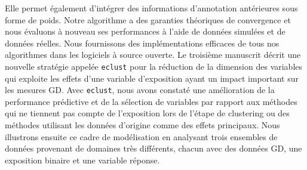 \documentclass[12pt,letterpaper]{report}
\begin{document}
\begin{romanPagenumber}{2}
{Elle permet également d'intégrer des informations d'annotation antérieures sous forme de poids. 
Notre algorithme a des garanties théoriques de convergence et nous évaluons à nouveau ses performances à l'aide de données simulées et de données réelles. Nous fournissons des implémentations efficaces de tous nos algorithmes dans les logiciels à source ouverte.
Le troisième manuscrit décrit une nouvelle stratégie appelée \texttt{eclust} pour la réduction de la dimension des variables qui exploite les effets d'une variable d'exposition ayant un impact important sur les mesures GD. Avec \texttt{eclust}, nous avons constaté une amélioration de la performance prédictive et de la sélection de variables par rapport aux méthodes qui ne tiennent pas compte de l'exposition lors de l'étape de clustering ou des méthodes utilisant les données d'origine comme des effets principaux. Nous illustrons ensuite ce cadre de modélisation en analysant trois ensembles de données provenant de domaines très différents, chacun avec des données GD, une exposition binaire et une variable réponse.
	}
	\AbstractFr
	
	
	\tableofcontents 

	\listoftables 
	\listoffigures
	
	\newpage
	
	\printacronyms[include-classes=abbrev,name=Abbreviations]
	\end{romanPagenumber}

\else
\fi


\doublespacing

\ifthesis
	
	
	
	
	
	
	
\else
	
	
	
	
	
	
	
\fi
\end{document}
